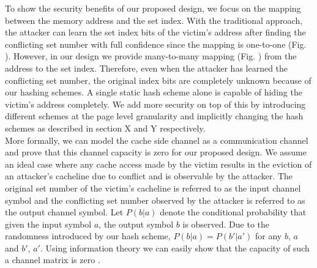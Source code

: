 To show the security benefits of our proposed design, we focus on the mapping between the memory address and the set index. With the traditional approach, the attacker can learn the set index bits of the victim's address after finding the conflicting set number with full confidence since the mapping is one-to-one (Fig. \cite{fig:one-to-one}). However, in our design we provide many-to-many mapping (Fig. \cite{fig:many-to-many}) from the address to the set index. Therefore, even when the attacker has learned the conflicting set number, the original index bits are completely unknown because of our hashing schemes. A single static hash scheme alone is capable of hiding the victim's address completely. We add more security on top of this by introducing different schemes at the page level granularity and implicitly changing the hash schemes as described in section X and Y respectively. \\
More formally, we can model the cache side channel as a communication channel and prove that this channel capacity is zero for our proposed design. We assume an ideal case where any cache access made by the victim results in the eviction of an attacker's cacheline due to conflict and is observable by the attacker. The original set number of the victim's cacheline is referred to as the input channel symbol and the conflicting set number observed by the attacker is referred to as the output channel symbol. Let $P(b|a)$ denote the conditional probability that given the input symbol $a$, the output symbol $b$ is observed. Due to the randomness introduced by our hash scheme, $P(b|a) = P(b'|a')$ for any $b$, $a$ and $b'$, $a'$. Using information theory we can easily show that the capacity of such a channel matrix is zero \cite{info_theory}.
